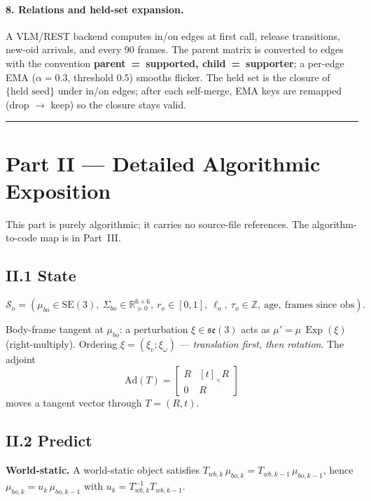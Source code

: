 \documentclass[11pt]{article}
\DeclareMathOperator{\Exp}{Exp}
\newcommand{\R}{\mathbb{R}}
\newcommand{\SE}{\mathrm{SE}(3)}
\newcommand{\se}{\mathfrak{se}(3)}
\newcommand{\Ad}{\mathrm{Ad}}
\begin{document}
\paragraph{8. Relations and held-set expansion.} A VLM/REST backend computes
in/on edges at first call, release transitions, new-oid arrivals, and every
90 frames. The parent matrix is converted to edges with the convention
\textbf{parent~=~supported, child~=~supporter}; a per-edge EMA
($\alpha{=}0.3$, threshold $0.5$) smooths flicker. The held set is the
closure of $\{\text{held seed}\}$ under in/on edges; after each self-merge,
EMA keys are remapped (drop $\to$ keep) so the closure stays valid.

\bigskip\hrule\bigskip

\section*{Part II --- Detailed Algorithmic Exposition}
\label{sec:algo}

This part is purely algorithmic; it carries no source-file references. The
algorithm-to-code map is in Part~III.

\subsection*{II.1 State}

$$\mathcal{S}_o = (\mu_{bo}\in\SE,\ \Sigma_{bo}\in\R^{6\times 6}_{\succeq 0},\
  r_o\in[0,1],\ \ell_o,\ \tau_o\in\mathbb{Z},\ \text{age},\ \text{frames since obs}).$$

Body-frame tangent at $\mu_{bo}$: a perturbation $\xi\in\se$ acts as
$\mu' = \mu\,\Exp(\xi)$ (right-multiply). Ordering
$\xi=(\xi_v;\xi_\omega)$ --- \emph{translation first, then rotation}. The
adjoint
$$\Ad(T) = \begin{bmatrix} R & [t]_\times R \\ 0 & R \end{bmatrix}$$
moves a tangent vector through $T=(R,t)$.

\subsection*{II.2 Predict}

\textbf{World-static.} A world-static object satisfies
$T_{wb,k}\,\mu_{bo,k} = T_{wb,k-1}\,\mu_{bo,k-1}$, hence
$\mu_{bo,k} = u_k\,\mu_{bo,k-1}$ with
$u_k = T_{wb,k}^{-1}T_{wb,k-1}$.
\end{document}

